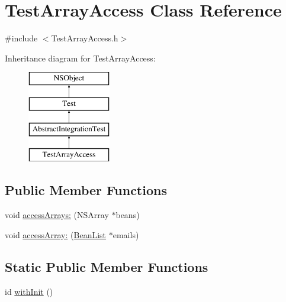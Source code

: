 \hypertarget{interface_test_array_access}{
\section{\-Test\-Array\-Access \-Class \-Reference}
\label{interface_test_array_access}
}


{\ttfamily \#include $<$\-Test\-Array\-Access.\-h$>$}

\-Inheritance diagram for \-Test\-Array\-Access\-:\begin{figure}[H]
\begin{center}
\leavevmode
\includegraphics[height=4.000000cm]{interface_test_array_access}
\end{center}
\end{figure}
\subsection*{\-Public \-Member \-Functions}
\begin{DoxyCompactItemize}
\item 
void \hyperlink{interface_test_array_access_a5b3387e7c5178e2c31155dfe57c894e7}{access\-Arrays\-:} (\-N\-S\-Array $\ast$beans)
\item 
void \hyperlink{interface_test_array_access_a1e0082115f157d51a1989ad0b20d6c1e}{access\-Array\-:} (\hyperlink{interface_bean_list}{\-Bean\-List} $\ast$emails)
\end{DoxyCompactItemize}
\subsection*{\-Static \-Public \-Member \-Functions}
\begin{DoxyCompactItemize}
\item 
id \hyperlink{interface_test_array_access_a9aa1abfc7e58be60e5abd2f380426311}{with\-Init} ()
\end{DoxyCompactItemize}


